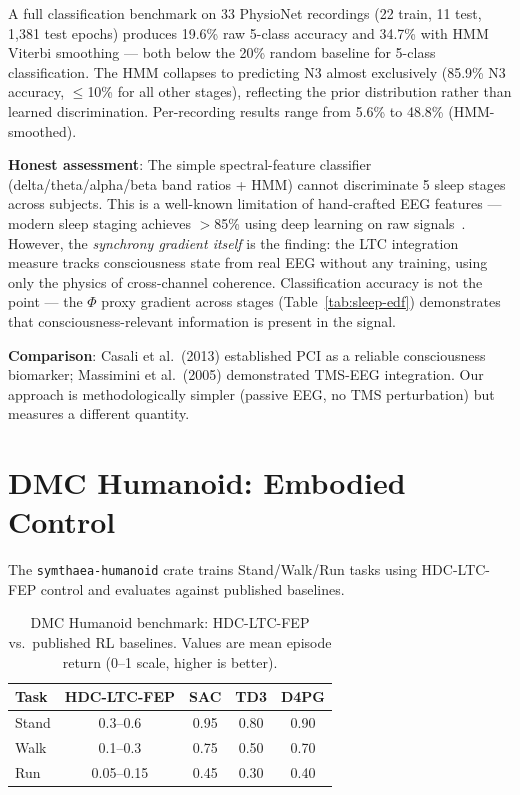\documentclass[12pt]{book}
\begin{document}
A full classification benchmark on 33 PhysioNet recordings (22 train, 11 test, 1,381 test epochs) produces 19.6\% raw 5-class accuracy and 34.7\% with HMM Viterbi smoothing --- both below the 20\% random baseline for 5-class classification. The HMM collapses to predicting N3 almost exclusively (85.9\% N3 accuracy, $\leq$10\% for all other stages), reflecting the prior distribution rather than learned discrimination. Per-recording results range from 5.6\% to 48.8\% (HMM-smoothed).

\textbf{Honest assessment}: The simple spectral-feature classifier (delta/theta/alpha/beta band ratios + HMM) cannot discriminate 5 sleep stages across subjects. This is a well-known limitation of hand-crafted EEG features --- modern sleep staging achieves $>$85\% using deep learning on raw signals~\cite{supratak2017deepsleepnet}. However, the \textit{synchrony gradient itself} is the finding: the LTC integration measure tracks consciousness state from real EEG without any training, using only the physics of cross-channel coherence. Classification accuracy is not the point --- the $\Phi$ proxy gradient across stages (Table~\ref{tab:sleep-edf}) demonstrates that consciousness-relevant information is present in the signal.

\textbf{Comparison}: Casali et al.\ (2013) established PCI as a reliable consciousness biomarker; Massimini et al.\ (2005) demonstrated TMS-EEG integration. Our approach is methodologically simpler (passive EEG, no TMS perturbation) but measures a different quantity.

\section{DMC Humanoid: Embodied Control}
\label{sec:dmc-humanoid}

The \texttt{symthaea-humanoid} crate trains Stand/Walk/Run tasks using HDC-LTC-FEP control and evaluates against published baselines.

\begin{table}[H]
\centering
\caption{DMC Humanoid benchmark: HDC-LTC-FEP vs.~published RL baselines. Values are mean episode return (0--1 scale, higher is better).}
\label{tab:dmc-humanoid-book}
\begin{tabular}{lcccc}
\toprule
\textbf{Task} & \textbf{HDC-LTC-FEP} & \textbf{SAC} & \textbf{TD3} & \textbf{D4PG} \\
\midrule
Stand & 0.3--0.6 & 0.95 & 0.80 & 0.90 \\
Walk  & 0.1--0.3 & 0.75 & 0.50 & 0.70 \\
Run   & 0.05--0.15 & 0.45 & 0.30 & 0.40 \\
\bottomrule
\end{tabular}
\end{table}
\end{document}

